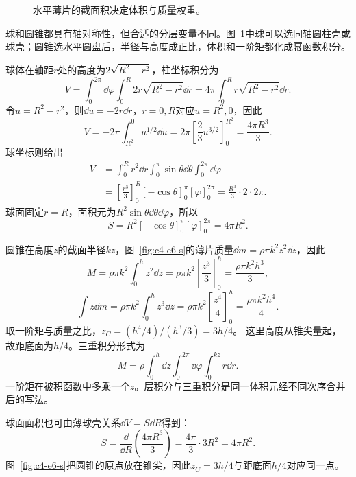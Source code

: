 \begin{figure}[H]\centering
{}
\caption{水平薄片的截面积决定体积与质量权重。}\label{fig:c4-e6-q}
\end{figure}
\begin{solution}
球和圆锥都具有轴对称性，但合适的分层变量不同。图~\ref{fig:c4-e6-q}中球可以选同轴圆柱壳或球壳；圆锥选水平圆盘后，半径与高度成正比，体积和一阶矩都化成幂函数积分。


球体在轴距$r$处的高度为$2\sqrt{R^2-r^2}$，柱坐标积分为
\[V=\int_0^{2\pi}\dd\varphi\int_0^R2r\sqrt{R^2-r^2}\dd r
=4\pi\int_0^Rr\sqrt{R^2-r^2}\dd r.\]
令$u=R^2-r^2$，则$\dd u=-2r\dd r$，$r=0,R$对应$u=R^2,0$，因此
\[V=-2\pi\int_{R^2}^0u^{1/2}\dd u
=2\pi\left[\frac23u^{3/2}\right]_0^{R^2}
=\frac{4\pi R^3}{3}.\]
球坐标则给出
\[\begin{aligned}
V&=\int_0^Rr^2\dd r\int_0^\pi\sin\theta\dd\theta
\int_0^{2\pi}\dd\varphi\\
&=\left[\frac{r^3}{3}\right]_0^R[-\cos\theta]_0^\pi
[\varphi]_0^{2\pi}=\frac{R^3}{3}\cdot2\cdot2\pi.
\end{aligned}\]
球面固定$r=R$，面积元为$R^2\sin\theta\dd\theta\dd\varphi$，所以
\[S=R^2[-\cos\theta]_0^\pi[\varphi]_0^{2\pi}=4\pi R^2.\]

圆锥在高度$z$的截面半径$kz$，图~\ref{fig:c4-e6-s}的薄片质量$\dd m=\rho\pi k^2z^2\dd z$，因此
\[M=\rho\pi k^2\int_0^hz^2\dd z
=\rho\pi k^2\left[\frac{z^3}{3}\right]_0^h
=\frac{\rho\pi k^2h^3}{3},\]
\[\int z\dd m=\rho\pi k^2\int_0^hz^3\dd z
=\rho\pi k^2\left[\frac{z^4}{4}\right]_0^h
=\frac{\rho\pi k^2h^4}{4}.\]
取一阶矩与质量之比，$z_C=(h^4/4)/(h^3/3)=\boxed{3h/4}$。
这里高度从锥尖量起，故距底面为$h/4$。三重积分形式为
\[M=\rho\int_0^h\dd z\int_0^{2\pi}\dd\varphi\int_0^{kz}r\dd r.\]
一阶矩在被积函数中多乘一个$z$。层积分与三重积分是同一体积元经不同次序合并后的写法。


球面面积也可由薄球壳关系$\dd V=S\dd R$得到：
\[S=\frac{\dd}{\dd R}\left(\frac{4\pi R^3}{3}\right)
=\frac{4\pi}{3}\cdot3R^2=4\pi R^2.\]
图~\ref{fig:c4-e6-s}把圆锥的原点放在锥尖，因此$z_C=3h/4$与距底面$h/4$对应同一点。


\end{solution}

